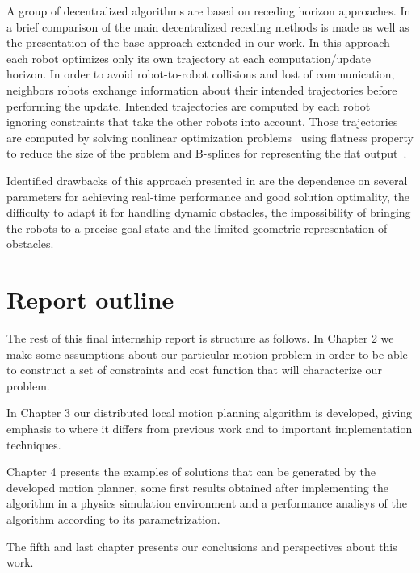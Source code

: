 A group of decentralized algorithms are based on receding horizon approaches.
In \cite{Defoort2009} a brief comparison of the main decentralized receding 
methods is made as well as the presentation of the base approach extended in
our work.
In this approach each robot optimizes only its own 
trajectory at each computation/update horizon. In order to
avoid robot-to-robot collisions and lost of communication, neighbors robots 
exchange information about their intended trajectories before 
performing the update. Intended trajectories are computed by each robot
ignoring constraints that take the other robots into account.
Those trajectories are computed by
solving nonlinear optimization problems~\cite{betts1998survey}
using flatness property to reduce the size of the problem and B-splines for representing
the flat output~\cite{milam2003real}.

Identified drawbacks of this approach presented in \cite{Defoort2009} are the dependence on 
several parameters for achieving real-time performance and good solution 
optimality, the difficulty to adapt it for handling dynamic obstacles, the 
impossibility of bringing the robots to a precise goal state and the limited
geometric representation of obstacles.

\section{Report outline}

The rest of this final internship report is structure as follows. In Chapter 2 we make some assumptions about our particular motion problem in order to be able to construct a set of constraints and cost function that will characterize our problem.

In Chapter 3 our distributed
local motion planning algorithm is developed, giving emphasis to where it differs from previous 
work and to important implementation techniques.

Chapter 4 presents the examples of solutions that can be generated by the developed motion planner, some first results obtained after implementing the algorithm in a physics simulation environment and a performance analisys of the algorithm according to its parametrization.

The fifth and last chapter presents our conclusions and perspectives about this work.

%
%
%
%

